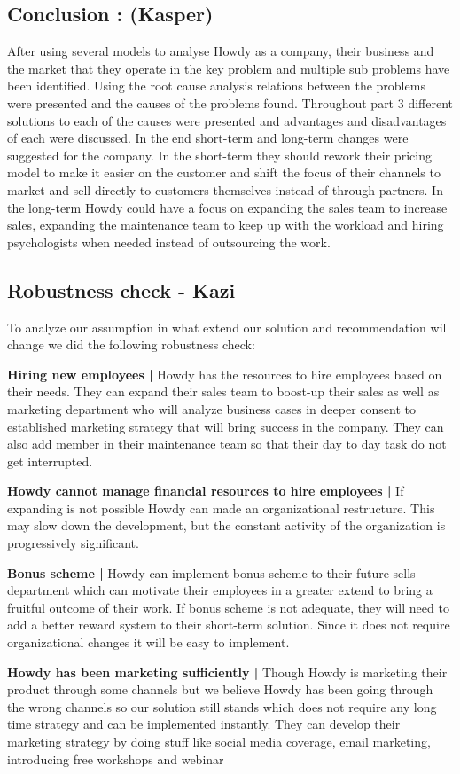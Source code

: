 \subsection{Conclusion : (Kasper) }
After using several models to analyse Howdy as a company, their business and the market that they operate in the key problem and multiple sub problems have been identified. Using the root cause analysis relations between the problems were presented and the causes of the problems found. Throughout part 3 different solutions to each of the causes were presented and advantages and disadvantages of each were discussed. In the end short-term and long-term changes were suggested for the company. In the short-term they should rework their pricing model to make it easier on the customer and shift the focus of their channels to market and sell directly to customers themselves instead of through partners. In the long-term Howdy could have a focus on expanding the sales team to increase sales, expanding the maintenance team to keep up with the workload and hiring psychologists when needed instead of outsourcing the work.

\subsection{Robustness check - Kazi}

To analyze our assumption in what extend our solution and recommendation will change we did the following robustness check:

\noindent\textbf{Hiring new employees |} Howdy has the resources to hire employees based on their needs. They can expand their sales team to boost-up their sales as well as marketing department who will analyze business cases in deeper consent to established marketing strategy that will bring success in the company. They can also add member in their maintenance team so that their day to day task do not get interrupted.

\noindent \textbf{Howdy cannot manage financial resources to hire employees |} If expanding is not possible Howdy can made an organizational restructure. This may slow down the development, but the constant activity of the organization is progressively significant.

\noindent \textbf{Bonus scheme |} Howdy can implement bonus scheme to their future sells department which can motivate their employees in a greater extend to bring a fruitful outcome of their work. If bonus scheme is not adequate, they will need to add a better reward system to their short-term solution. Since it does not require organizational changes it will be easy to implement.

\noindent \textbf{Howdy has been marketing sufficiently |} Though Howdy is marketing their product through some channels but we believe Howdy has been going through the wrong channels so our solution still stands which does not require any long time strategy and can be implemented instantly. They can develop their marketing strategy by doing stuff like social media coverage, email marketing, introducing free workshops and webinar
